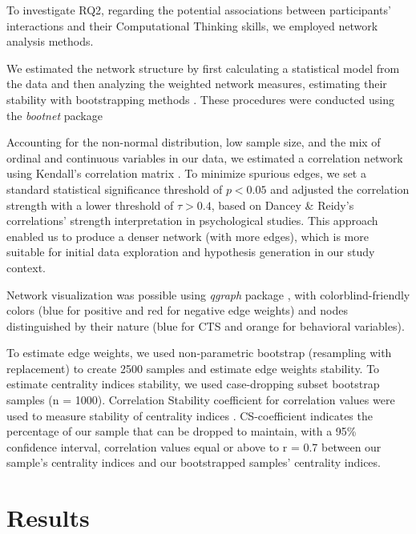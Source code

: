 \documentclass[sn-mathphys, Numbered]{sn-jnl}%
\theoremstyle{thmstyleone}%
\theoremstyle{thmstyletwo}%
\theoremstyle{thmstylethree}%
\begin{document}
To investigate RQ2, regarding the potential associations between participants' interactions and their Computational Thinking skills, we employed network analysis methods.

We estimated the network structure by first calculating a statistical model from the data and then analyzing the weighted network measures, estimating their stability with bootstrapping methods \parencite{kotz_bootstrap_1992, hevey_network_2018}. These procedures were conducted using the \textit{bootnet} package \parencite{epskamp_estimating_2018}

Accounting for the non-normal distribution, low sample size, and the mix of ordinal and continuous variables in our data, we estimated a correlation network using Kendall's correlation matrix \parencite*{kendall_rank_1949}.  To minimize spurious edges, we set a standard statistical significance threshold of $p < 0.05$ and adjusted the correlation strength with a lower threshold of $\tau > 0.4$, based on Dancey \& Reidy's \parencite*{dancey_statistics_2007} correlations' strength interpretation in psychological studies.
This approach enabled us to produce a denser network (with more edges), which is more suitable for initial data exploration and hypothesis generation in our study context.

Network visualization was possible using \textit{qgraph} package \parencite{epskamp_qgraph_2012}, with colorblind-friendly colors (blue for positive and red for negative edge weights) and nodes distinguished by their nature (blue for CTS and orange for behavioral variables).

To estimate edge weights, we used non-parametric bootstrap (resampling with replacement) to create 2500 samples and estimate edge weights stability. To estimate centrality indices stability, we used case-dropping subset bootstrap samples (n = 1000). Correlation Stability coefficient for correlation values were used to measure stability of centrality indices \parencite{epskamp_estimating_2018}. CS-coefficient indicates the percentage of our sample that can be dropped to maintain, with a 95\% confidence interval, correlation values equal or above to r = 0.7 between our sample’s centrality indices and our bootstrapped samples' centrality indices.



\section{Results}
\end{document}
